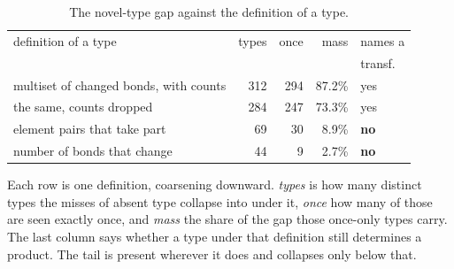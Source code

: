 \begin{table}[t]
\centering\small
\begin{threeparttable}
\caption{The novel-type gap against the definition of a type.}
\label{tab:grain}
\begin{tabular}{lrrrl}
\toprule
definition of a type & types & once & mass & names a \\
 & & & & transf. \\
\midrule
multiset of changed bonds, with counts & 312 & 294 & 87.2\% & yes \\
the same, counts dropped & 284 & 247 & 73.3\% & yes \\
element pairs that take part & 69 & 30 & 8.9\% & \textbf{no} \\
number of bonds that change & 44 & 9 & 2.7\% & \textbf{no} \\
\bottomrule
\end{tabular}
\begin{tablenotes}[flushleft]\footnotesize
\item Each row is one definition, coarsening downward. \emph{types} is how many distinct types the misses of absent type collapse into under it, \emph{once} how many of those are seen exactly once, and \emph{mass} the share of the gap those once-only types carry. The last column says whether a type under that definition still determines a product. The tail is present wherever it does and collapses only below that.
\end{tablenotes}
\end{threeparttable}
\end{table}
